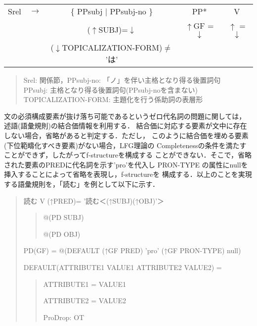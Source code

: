 \begin{table}[htbp]
\begin{center}
\begin{tabular}{llccc}
Srel  \quad& $\longrightarrow$\qquad & \qquad \{ PPsubj $|$
 PPsubj-no \}\qquad & PP* & V\\
&&($\uparrow$SUBJ)=$\downarrow$& $\uparrow$GF = $\downarrow$ & \hspace{-4.5mm}
 $\uparrow$ = $\downarrow$ \\
&&($\downarrow$TOPICALIZATION-FORM)$\neq$ 'は'&&\\
\end{tabular}
\end{center}
\begin{quote}
Srel: 関係節，PPsubj-no: 「ノ」を伴い主格となり得る後置詞句\\
PPsubj: 主格となり得る後置詞句(PPsubj-noを含まない)\\
TOPICALIZATION-FORM: 主題化を行う係助詞の表層形
\end{quote}
\end{table}
\vspace{3mm}
文の必須構成要素が抜け落ち可能であるというゼロ代名詞の問題に関しては，
述語(語彙規則)の結合価情報を利用する．
結合価に対応する要素が文中に存在しない場合，省略があると判定する．ただし，
このように結合価を埋める要素(下位範疇化すべき要素)がない場合，LFG理論の
Completenessの条件を満たすことができず，したがってf-structureを構成する
ことができない．そこで，省略された要素のPREDに代名詞を示す'pro'を代入し
PRON-TYPE の属性にnullを挿入することによって省略を表現し，f-structureを
構成する．以上のことを実現する語彙規則を，「読む」を例として以下に示す．

\vspace{4mm}
{\small
\begin{quote}
読む \quad V \quad (↑PRED)= '読む＜(↑SUBJ)(↑OBJ)'＞
\begin{quote}
\vspace{0.4mm}
\qquad @(PD SUBJ)

\vspace{0.5mm}
\qquad @(PD OBJ)
\end{quote}
\vspace{0.4mm}
PD(GF) = @(DEFAULT (↑GF PRED) 'pro' (↑GF PRON-TYPE) null)

\vspace{0.5mm}
DEFAULT(ATTRIBUTE1 VALUE1 ATTRIBUTE2 VALUE2) = 
\begin{quote}
\vspace{0.4mm}
\qquad ATTRIBUTE1 = VALUE1

\vspace{0.5mm}
\qquad ATTRIBUTE2 = VALUE2

\vspace{0.5mm}
\qquad ProDrop: OT
\end{quote}
\end{quote}
}

